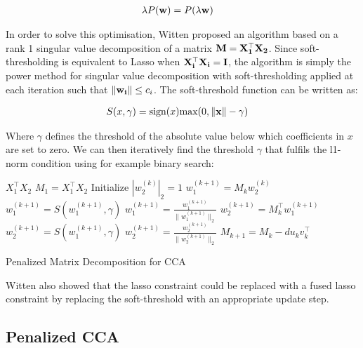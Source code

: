 \begin{align}
    & \lambda P(\bold{w})=P(\lambda \bold{w})
\end{align}

In order to solve this optimisation, Witten proposed an algorithm based on a rank 1 singular value decomposition of a matrix $\bold{M}=\bold{X_1^{\top}X_2}$. Since soft-thresholding is equivalent to Lasso when $\bold{X_i^{\top}X_i}=\bold{I}$, the algorithm is simply the power method for singular value decomposition with soft-thresholding applied at each iteration such that $\|\bold{w_i}\| \leq c_i$. The soft-threshold function can be written as:

\begin{align}
    \label{eq:softthreshold}
    & S(x,\gamma) = \text{sign}(x)\text{max}(0,\|\bold{x}\|-\gamma)
\end{align}

Where $\gamma$ defines the threshold of the absolute value below which coefficients in $x$ are set to zero. We can then iteratively find the threshold $\gamma$ that fulfils the l1-norm condition using for example binary search:

\vspace{\baselineskip}
\begin{algorithm}[H]
\begin{algorithmic}
 $X_1^{\top}X_2$
\STATE $M_1=X_1^{\top}X_2$
    \STATE Initialize $|w^{(k)}_2|_2=1$
        \STATE $w^{(k+1)}_1=M_kw^{(k)}_2$
        \STATE $w^{(k+1)}_1=S(w^{(k+1)}_1,\gamma)$
        \STATE $w^{(k+1)}_1=\frac{w^{(k+1)}_1}{\|w^{(k+1)}_1\|_2}$
        \STATE $w^{(k+1)}_2=M_k^{\top}w^{(k+1)}_1$
        \STATE $w^{(k+1)}_2=S(w^{(k+1)}_1,\gamma)$
        \STATE $w^{(k+1)}_2=\frac{w^{(k+1)}_2}{\|w^{(k+1)}_2\|_2}$
        \STATE $M_{k+1}=M_k-du_kv_k^{\top}$
    \ENDWHILE
\ENDFOR
\caption[Penalized Matrix Decomposition]{Penalized Matrix Decomposition for CCA}
\end{algorithmic}
\end{algorithm}
\vspace{\baselineskip}

Witten also showed that the lasso constraint could be replaced with a fused lasso constraint by replacing the soft-threshold with an appropriate update step.

\subsection{Penalized CCA}

